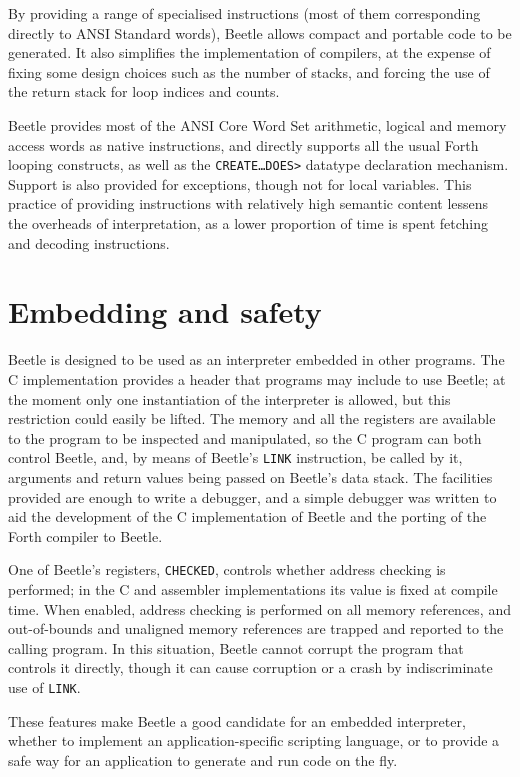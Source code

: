 \documentclass{article}
\newcommand{\conc}[1]{\texttt{\textup{#1}}}
\begin{document}
By providing a range of specialised instructions (most of them corresponding
directly to ANSI Standard words), Beetle allows compact and portable code to
be generated. It also simplifies the implementation of compilers, at the
expense of fixing some design choices such as the number of stacks, and
forcing the use of the return stack for loop indices and counts.

Beetle provides most of the ANSI Core Word Set arithmetic, logical and memory
access words as native instructions, and directly supports all the usual
Forth looping constructs, as well as the \conc{CREATE\dots DOES>} datatype
declaration mechanism. Support is also provided for exceptions, though not
for local variables. This practice of providing instructions with relatively
high semantic content lessens the overheads of interpretation, as a lower
proportion of time is spent fetching and decoding instructions.



\section{Embedding and safety}

Beetle is designed to be used as an interpreter embedded in other programs.
The C implementation provides a header that programs may include to use
Beetle; at the moment only one instantiation of the interpreter is allowed,
but this restriction could easily be lifted. The memory and all the registers
are available to the program to be inspected and manipulated, so the C
program can both control Beetle, and, by means of Beetle's \conc{LINK}
instruction, be called by it, arguments and return values being passed on
Beetle's data stack. The facilities provided are enough to write a debugger,
and a simple debugger was written to aid the development of the C
implementation of Beetle and the porting of the Forth compiler to Beetle.

One of Beetle's registers, \conc{CHECKED}, controls whether address checking
is performed; in the C and assembler implementations its value is fixed at
compile time. When enabled, address checking is performed on all memory
references, and out-of-bounds and unaligned memory references are trapped and
reported to the calling program. In this situation, Beetle cannot corrupt the
program that controls it directly, though it can cause corruption or a crash
by indiscriminate use of \conc{LINK}.

These features make Beetle a good candidate for an embedded interpreter,
whether to implement an application-specific scripting language, or to
provide a safe way for an application to generate and run code on the fly.
\end{document}
